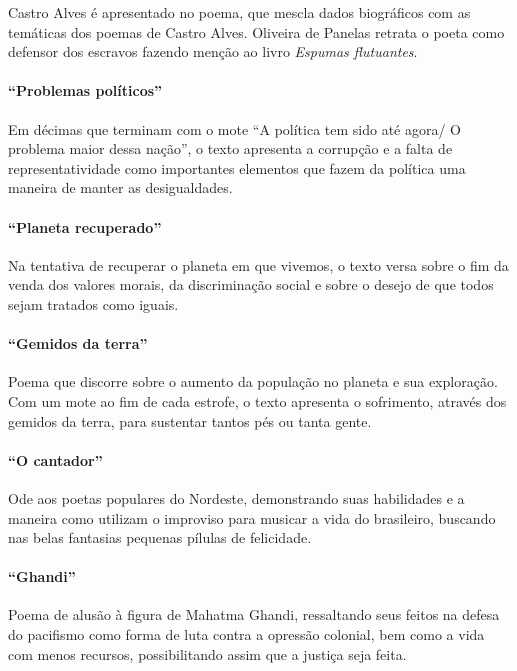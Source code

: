 Castro Alves é apresentado no poema, que mescla dados biográficos com
as temáticas dos poemas de Castro Alves. Oliveira de Panelas retrata o poeta como
defensor dos escravos fazendo menção ao livro \textit{Espumas flutuantes}.

\paragraph{``Problemas políticos''}

Em décimas que terminam com o mote ``A política tem
sido até agora/ O problema maior dessa nação'', o
texto apresenta a corrupção e a falta de representatividade como
importantes elementos que fazem da política uma maneira de manter as
desigualdades.

\paragraph{``Planeta recuperado''}

Na tentativa de recuperar o planeta em que vivemos, o texto versa sobre o
fim da venda dos valores morais, da discriminação social e sobre o
desejo de que todos sejam tratados como iguais.

\paragraph{``Gemidos da terra''}

Poema que discorre sobre o aumento da população no planeta e sua
exploração. Com um mote ao fim de cada estrofe, o texto
apresenta o sofrimento, através dos gemidos da terra, para sustentar
tantos pés ou tanta gente.

\paragraph{``O cantador''}

Ode aos poetas populares do Nordeste, demonstrando suas habilidades e a
maneira como utilizam o improviso para musicar a vida do
brasileiro, buscando nas belas fantasias pequenas pílulas de
felicidade.

\paragraph{``Ghandi''}

Poema de alusão à figura de Mahatma Ghandi, ressaltando seus feitos na
defesa do pacifismo como forma de luta contra a opressão colonial, bem
como a vida com menos recursos, possibilitando assim que a justiça seja
feita.

